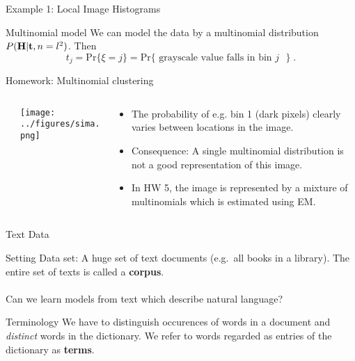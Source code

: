 \documentclass[dvipsnames,mathserif]{beamer}
\def\lsep{\\ \mbox{ } \\}
\begin{document}
{\begin{frame}{Example 1: Local Image Histograms}
  \begin{block}{Multinomial model}
    We can model the data by a multinomial distribution
    $P(\mathbf{H}|\mathbf{t},n=l^2)$. Then
    \begin{equation*}
      t_j=\mbox{Pr}\lbrace \xi=j \rbrace =
      \mbox{Pr}\lbrace \text{ grayscale value falls in bin $j$ }\rbrace \;.
    \end{equation*}
  \end{block}
  \begin{block}{Homework: Multinomial clustering}
    \begin{columns}
      \begin{column}{0\textwidth}
      \end{column}
      \begin{column}{0.3\textwidth}
        \begin{center}
        \texttt{[image: ../figures/sima.png]}
        \end{center}
      \end{column}
      \begin{column}{0.7\textwidth}
        \begin{itemize}
          \item The probability of e.g. bin 1 (dark pixels) clearly varies between locations in the image.
          \item Consequence: A single multinomial distribution is not a good representation of this image.
          \item In HW 5, the image is represented by a mixture of multinomials which is estimated using EM.
        \end{itemize}
      \end{column}
    \end{columns}
  \end{block}
\end{frame}


\begin{frame}{Text Data}
  \begin{block}{Setting}
    Data set: A huge set of text documents (e.g.\ all books in a
    library). The entire set of texts is called a \textbf{corpus}.
    \lsep
    Can we learn models from text which describe natural language?
  \end{block}
  \begin{block}{Terminology}
    We have to distinguish occurences of words in a document and
    \emph{distinct} words in the dictionary. We refer to words
    regarded as entries of the dictionary
    as \textbf{terms}.
  \end{block}
\end{frame}

}
\end{document}
